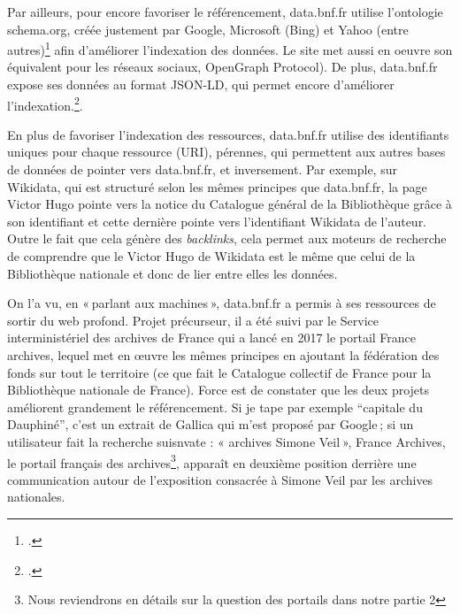 Par ailleurs, pour encore favoriser le référencement, data.bnf.fr utilise l’ontologie schema.org, créée justement par Google, Microsoft (Bing) et Yahoo (entre autres)\footcite{zotero-237} afin d’améliorer l’indexation des données. Le site met aussi en oeuvre son équivalent pour les réseaux sociaux, OpenGraph Protocol). De plus, data.bnf.fr expose ses données au format JSON-LD, qui permet encore d’améliorer l’indexation.\footcite{zotero-236}.

En plus de favoriser l’indexation des ressources, data.bnf.fr utilise des identifiants uniques pour chaque ressource (URI), pérennes, qui permettent aux autres bases de données de pointer vers data.bnf.fr, et inversement. Par exemple, sur Wikidata, qui est structuré selon les mêmes principes que data.bnf.fr, la page Victor Hugo pointe vers la notice du Catalogue général de la Bibliothèque grâce à son identifiant et cette dernière pointe vers l’identifiant Wikidata de l’auteur. Outre le fait que cela génère des \textit{backlinks}, cela permet aux moteurs de recherche de comprendre que le Victor Hugo de Wikidata est le même que celui de la Bibliothèque nationale et donc de lier entre elles les données.

On l’a vu, en « parlant aux machines », data.bnf.fr a permis à ses ressources de sortir du web profond. Projet précurseur, il a été suivi par le Service interministériel des archives de France qui a lancé en 2017 le portail France archives, lequel met en œuvre les mêmes principes en ajoutant la fédération des fonds sur tout le territoire (ce que fait le Catalogue collectif de France pour la Bibliothèque nationale de France). Force est de constater que les deux projets améliorent grandement le référencement. Si je tape par exemple \enquote{capitale du Dauphiné}, c’est un extrait de Gallica qui m’est proposé par Google ; si un utilisateur fait la recherche suisnvate : « archives Simone Veil », France Archives, le portail français des archives\footnote{Nous reviendrons en détails sur la question des portails dans notre partie 2}, apparaît en deuxième position derrière une communication autour de l’exposition consacrée à Simone Veil par les archives nationales.

